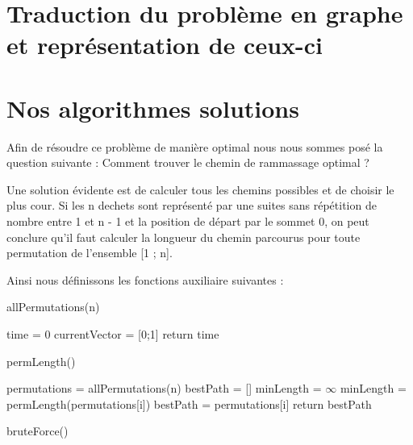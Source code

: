\documentclass{article}
\begin{document}
\section{Traduction du problème en graphe et représentation de ceux-ci}

\section{Nos algorithmes solutions}

Afin de résoudre ce problème de manière optimal nous nous sommes posé la question suivante : Comment trouver le chemin de rammassage optimal ?

Une solution évidente est de calculer tous les chemins possibles et de choisir le plus cour. Si les n dechets sont représenté par une suites sans répétition de nombre entre 1 et n - 1 et la position de départ par le sommet 0, on peut conclure qu'il faut calculer la longueur du chemin parcourus pour toute permutation de l'ensemble [1 ; n].

Ainsi nous définissons les fonctions auxiliaire suivantes : \\

\begin{algorithm}[H]
  \SetAlgoLined
  \caption{allPermutations(n)}
\end{algorithm}

\begin{algorithm}[H]
    \SetAlgoLined
    time = 0\;
    currentVector = [0;1]\;
    return time\;
    \caption{permLength()}
  \end{algorithm}

  \begin{algorithm}[H]
    \SetAlgoLined
    permutations = allPermutations(n)\;
    bestPath = []\;
    minLength = $\infty$ \;
    {
        {
            minLength = permLength(permutations[i])\;
            bestPath = permutations[i]\;
        }
    }
    return bestPath\;
    \caption{bruteForce()}
  \end{algorithm}
\end{document}
